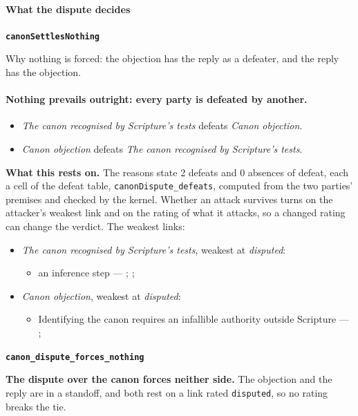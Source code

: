 \documentclass[11pt]{article}
\begin{document}
\paragraph*{What the dispute decides}
\leavevmode\par\nobreak
\par\medskip\noindent\textbf{\texttt{canon\allowbreak{}Settles\allowbreak{}Nothing}}\par\nobreak\noindent
Why nothing is forced: the objection has the reply as a defeater, and the reply has the objection.

\paragraph{Nothing prevails outright: every party is defeated by another.}
\begin{itemize}
\item \emph{The canon recognised by Scripture’s tests} defeats \emph{Canon objection}.
\item \emph{Canon objection} defeats \emph{The canon recognised by Scripture’s tests}.
\end{itemize}
\par\noindent\textbf{What this rests on.} The reasons state 2 defeats and 0 absences of defeat, each a cell of the defeat table, \texttt{canon\allowbreak{}Dispute\_\allowbreak{}defeats}, computed from the two parties' premises and checked by the kernel. Whether an attack survives turns on the attacker's weakest link and on the rating of what it attacks, so a changed rating can change the verdict. The weakest links:
\begin{itemize}
\item \emph{The canon recognised by Scripture’s tests}, weakest at \emph{disputed}:
\begin{itemize}
\item an inference step --- \cite[The criterion of inspiration]{reid-canon-new-testament-1908}; \cite[67--87]{kruger-canon-revisited-2012}; \cite[127--129]{mcdonald-integrity-biblical-canon-1996}
\end{itemize}
\item \emph{Canon objection}, weakest at \emph{disputed}:
\begin{itemize}
\item Identifying the canon requires an infallible authority outside Scripture --- \cite[Trent, Session IV (1546), Decree on Sacred Books and Traditions]{tanner-decrees-1990}; \cite[The criterion of inspiration]{reid-canon-new-testament-1908}
\end{itemize}
\end{itemize}
\par\medskip\noindent\textbf{\texttt{canon\_\allowbreak{}dispute\_\allowbreak{}forces\_\allowbreak{}nothing}}\par\nobreak\noindent
\textbf{The dispute over the canon forces neither side.} The objection and the reply are in a standoff, and both rest on a link rated \texttt{disputed}, so no rating breaks the tie.
\end{document}
